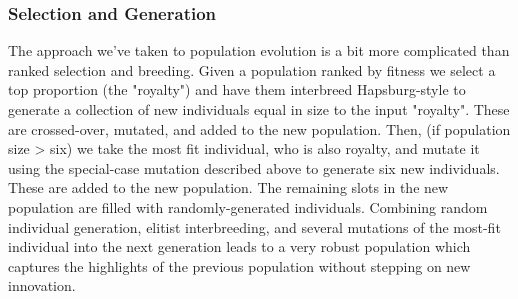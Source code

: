 \documentclass[12pt]{article}
\begin{document}
\subsubsection{Selection and Generation}
The approach we've taken to population evolution is a bit more complicated than ranked selection and breeding. Given a population ranked by fitness we select a top proportion (the "royalty") and have them interbreed Hapsburg-style to generate a collection of new individuals equal in size to the input "royalty". These are crossed-over, mutated, and added to the new population. Then, (if population size > six) we take the most fit individual, who is also royalty, and mutate it using the special-case mutation described above to generate six new individuals. These are added to the new population. The remaining slots in the new population are filled with randomly-generated individuals. Combining random individual generation, elitist interbreeding, and several mutations of the most-fit individual into the next generation leads to a very robust population which captures the highlights of the previous population without stepping on new innovation.  
\end{document}
